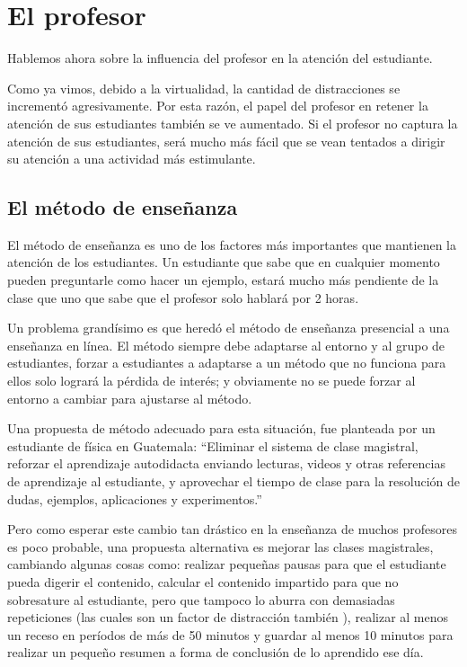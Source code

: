\section{El profesor}
Hablemos ahora sobre la influencia del profesor en la atención del estudiante. 

Como ya vimos, debido a la virtualidad, la cantidad de distracciones se incrementó agresivamente. Por esta razón, el papel del profesor en retener la atención de sus estudiantes también se ve aumentado. Si el profesor no captura la atención de sus estudiantes, será mucho más fácil que se vean tentados a dirigir su atención a una actividad más estimulante.

\subsection{El método de enseñanza}
El método de enseñanza es uno de los factores más importantes que mantienen la atención de los estudiantes. Un estudiante que sabe que en cualquier momento pueden preguntarle como hacer un ejemplo, estará mucho más pendiente de la clase que uno que sabe que el profesor solo hablará por 2 horas.

Un problema grandísimo es que heredó el método de enseñanza presencial a una enseñanza en línea. El método siempre debe adaptarse al entorno y al grupo de estudiantes, forzar a estudiantes a adaptarse a un método que no funciona para ellos solo logrará la pérdida de interés; y obviamente no se puede forzar al entorno a cambiar para ajustarse al método.

Una propuesta de método adecuado para esta situación, fue planteada por un estudiante de física en Guatemala: ``Eliminar el sistema de clase magistral, reforzar el aprendizaje autodidacta enviando lecturas, videos y otras referencias de aprendizaje al estudiante, y aprovechar el tiempo de clase para la resolución de dudas, ejemplos, aplicaciones y experimentos.''

Pero como esperar este cambio tan drástico en la enseñanza de muchos profesores es poco probable, una propuesta alternativa es mejorar las clases magistrales, cambiando algunas cosas como: realizar pequeñas pausas para que el estudiante pueda digerir el contenido, calcular el contenido impartido para que no sobresature al estudiante, pero que tampoco lo aburra con demasiadas repeticiones (las cuales son un factor de distracción también \cite{Lec5}), realizar al menos un receso en períodos de más de 50 minutos y guardar al menos 10 minutos para realizar un pequeño resumen a forma de conclusión de lo aprendido ese día. 

